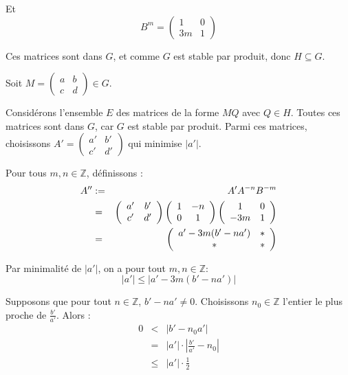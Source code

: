 Et
\[ B^m = \left(\begin{array}{cc}
     1 & 0\\
     3 m & 1
   \end{array}\right) \]


Ces matrices sont dans $G$, et comme $G$ est stable par produit, donc $H
\subseteq G$.

Soit $M = \left(\begin{array}{cc}
  a & b\\
  c & d
\end{array}\right) \in G$.

Consid{\'e}rons l'ensemble $E$ des matrices de la forme $MQ$ avec $Q \in H$.
Toutes ces matrices sont dans $G$, car $G$ est stable par produit. Parmi ces
matrices, choisissons $A' = \left(\begin{array}{cc}
  a' & b'\\
  c' & d'
\end{array}\right)$ qui minimise $|a' |$.

Pour tous $m, n \in \mathbb{Z}$, d{\'e}finissons :
\begin{eqnarray*}
  A'' & := & A' A^{- n} B^{- m}\\
  & = & \left(\begin{array}{cc}
    a' & b'\\
    c' & d'
  \end{array}\right) \left(\begin{array}{cc}
    1 & - n\\
    0 & 1
  \end{array}\right) \left(\begin{array}{cc}
    1 & 0\\
    - 3 m & 1
  \end{array}\right)\\
  & = & \left(\begin{array}{cc}
    a' - 3 m (b' - na') & \ast\\
    \ast & \ast
  \end{array}\right)
\end{eqnarray*}


Par minimalit{\'e} de $|a' |$, on a pour tout $m, n \in \mathbb{Z}$:
\[ |a' | \leq |a' - 3 m (b' - na') | \]


Supposons que pour tout $n \in \mathbb{Z}$, $b' - na' \neq 0$. Choisissons
$n_0 \in \mathbb{Z}$ l'entier le plus proche de $\frac{b'}{a'}$. Alors :
\begin{eqnarray*}
  0 & < & |b' - n_0 a' |\\
  & = & |a' | \cdot | \frac{b'}{a'} - n_0 |\\
  & \leqslant & | a'  | \cdot \frac{1}{2}
\end{eqnarray*}


